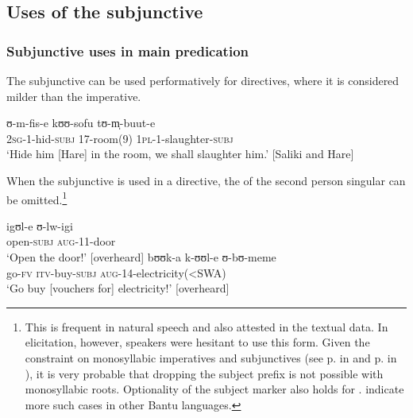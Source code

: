 \subsection{Uses of the subjunctive}
\subsubsection{Subjunctive uses in main predication}\label{SubjunctiveMainClause}
The subjunctive can be used performatively for directives, where it is considered milder than the imperative.
\begin{exe}
\ex
\gll ʊ-m-fis-e kʊʊ-sofu tʊ-m̩-buut-e\\
\textsc{2sg}-1-hid-\textsc{subj} 17-room(9) \textsc{1pl}-1-slaughter-\textsc{subj}\\
\glt `Hide him [Hare] in the room, we shall slaughter him.' [Saliki and Hare]
\end{exe}

\label{SUBJohneSM} When the subjunctive is used in a directive, the  of the second person singular can be omitted.\footnote{This is frequent in natural speech and also attested in the textual data. In elicitation, however, speakers were hesitant to use this form. Given the constraint on monosyllabic imperatives and subjunctives (see p.\nobreakspace\pageref{ImperativesMonosyllabic} in  and p.\nobreakspace\pageref{MonosyllabicSubjunctives} in ), it is very probable that dropping the subject prefix is not possible with monosyllabic roots. Optionality of the subject marker also holds for  \citep[323]{SeidelF2008}. \citet[21f]{DevosVanOlmen2013} indicate more such cases in other Bantu languages.}
\begin{exe}
\ex \gll igʊl-e ʊ-lw-igi\\
open-\textsc{subj} \textsc{aug}-11-door\\
\glt \lq Open the door!' [overheard]
\ex \gll bʊʊk-a k-ʊʊl-e ʊ-bʊ-meme\\
go-\textsc{fv} \textsc{itv}-buy-\textsc{subj} \textsc{aug}-14-electricity(<SWA)\\
\glt `Go buy [vouchers for] electricity!' [overheard]\footnotemark
\end{exe}
\protect{}

